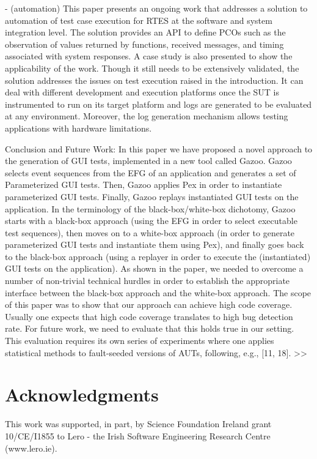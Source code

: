 \documentclass[runningheads,a4paper]{llncs}
\begin{document}
- (automation) This paper presents an ongoing work that addresses a solution to automation of
test case execution for RTES at the software and system integration level. The solution
provides an API to define PCOs such as the observation of values returned by functions, 
received messages, and timing associated with system responses.
A case study is also presented to show the applicability of the work. Though it
still needs to be extensively validated, the solution addresses the issues on test
execution raised in the introduction. It can deal with different development and
execution platforms once the SUT is instrumented to run on its target platform
and logs are generated to be evaluated at any environment. Moreover, the log
generation mechanism allows testing applications with hardware limitations.

Conclusion and Future Work: In this paper we have proposed a novel approach to the generation of 
GUI tests, implemented in a new tool called Gazoo. Gazoo selects event sequences
from the EFG of an application and generates a set of Parameterized GUI tests.
Then, Gazoo applies Pex in order to instantiate parameterized GUI tests. Finally,
Gazoo replays instantiated GUI tests on the application. In the terminology of
the black-box/white-box dichotomy, Gazoo starts with a black-box approach
(using the EFG in order to select executable test sequences), then moves on to a
white-box approach (in order to generate parameterized GUI tests and instantiate
them using Pex), and finally goes back to the black-box approach (using
a replayer in order to execute the (instantiated) GUI tests on the application).
As shown in the paper, we needed to overcome a number of non-trivial technical
hurdles in order to establish the appropriate interface between the black-box
approach and the white-box approach.
The scope of this paper was to show that our approach can achieve high
code coverage. Usually one expects that high code coverage translates to high
bug detection rate. For future work, we need to evaluate that this holds true
in our setting. This evaluation requires its own series of experiments where one
applies statistical methods to fault-seeded versions of AUTs, following, e.g., [11,
18].
>>


\section*{Acknowledgments}
This work was supported, in part, by Science Foundation Ireland grant 10/CE/I1855 to Lero - the Irish Software Engineering Research Centre (www.lero.ie).




\end{document}

